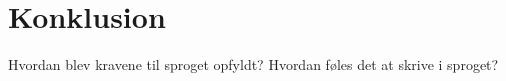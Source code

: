 \chapter{Konklusion}

Hvordan blev kravene til sproget opfyldt?
Hvordan føles det at skrive i sproget?
